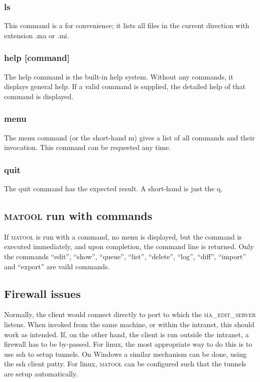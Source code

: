 \documentclass{article}
\newcommand{\mtc}{\textsc{matool}}
\newcommand{\mts}{\textsc{ma\_edit\_server}}
\begin{document}
\subsubsection*{ls}
This command is a for convenience; it lists all files in the current
direction with extension .ma or .mi.

\subsubsection*{help [command]}
The help command is the built-in help system. Without any commands, it
displays general help. If a valid command is supplied, the detailed
help of that command is displayed.

\subsubsection*{menu}
The menu command (or the short-hand m) gives a list of all commands
and their invocation. This command can be requested any time.

\subsubsection*{quit}
The quit command has the expected result. A short-hand is just the q.

\subsection{\mtc{} run with commands}
If \mtc{} is run with a command, no menu is displayed, but the command
is executed immediately, and upon completion, the command line is
returned. Only the commands ``edit'', ``show'', ``queue'', ``list'',
``delete'', ``log'', ``diff'', ``import'' and ``export'' are vaild
commands.

\subsection{Firewall issues}
Normally, the client would connect directly to port to which the
\mts{} listens. When invoked from the same machine, or within the
intranet, this should work as intended. If, on the other hand, the
client is run outside the intranet, a firewall has to be
by-passed. For linux, the most appropriate way to do this is to use
ssh to setup tunnels. On Windows a similar mechanism can be done,
using the ssh client putty. For linux, \mtc{} can  be configured such
that the tunnels are setup automatically.
\end{document}
